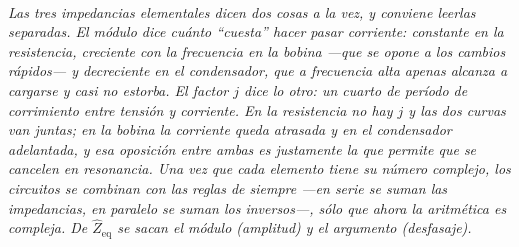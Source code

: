 \begin{center}
\begin{tikzpicture}[scale=1]
\end{tikzpicture}\\[0.5em]
{\small\itshape Las tres impedancias elementales dicen dos cosas a la vez, y
conviene leerlas separadas. El módulo dice cuánto ``cuesta'' hacer pasar
corriente: constante en la resistencia, creciente con la frecuencia en la bobina
---que se opone a los cambios rápidos--- y decreciente en el condensador, que a
frecuencia alta apenas alcanza a cargarse y casi no estorba. El factor $j$ dice
lo otro: un cuarto de período de corrimiento entre tensión y corriente. En la
resistencia no hay $j$ y las dos curvas van juntas; en la bobina la corriente
queda atrasada y en el condensador adelantada, y esa oposición entre ambas es
justamente la que permite que se cancelen en resonancia. Una vez que cada
elemento tiene su número complejo, los circuitos se combinan con las reglas de
siempre ---en serie se suman las impedancias, en paralelo se suman los
inversos---, sólo que ahora la aritmética es compleja. De $\hat Z_{\text{eq}}$
se sacan el módulo (amplitud) y el argumento (desfasaje).}
\end{center}
